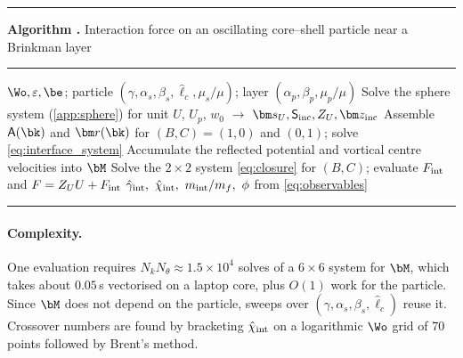 \begin{center}\begin{minipage}{\linewidth}\small
\hrule\smallskip
{}\label{alg:force}%
\noindent\textbf{Algorithm \thealgorithm.} Interaction force on an oscillating core--shell particle near a Brinkman layer
\smallskip\hrule\smallskip
\begin{algorithmic}[1]
\Require $\Wo,\varepsilon,\be$; particle $(\gamma,\alpha_s,\beta_s,\hat\ell_c,\mu_s/\mu)$; layer $(\alpha_p,\beta_p,\mu_p/\mu)$
\State Solve the sphere system (\cref{app:sphere}) for unit $U$, $U_p$, $w_0$ $\to$ $\bm s_U,\mathsf S_{\rm inc},Z_U,\bm z_{\rm inc}$
 
  \State Assemble $\mathsf A(\bk)$ and $\bm r(\bk)$ for $(B,C)=(1,0)$ and $(0,1)$; solve \cref{eq:interface_system}
  \State Accumulate the reflected potential and vortical centre velocities into $\bM$
\EndFor
\State Solve the $2\times2$ system \cref{eq:closure} for $(B,C)$; evaluate $F_{\rm int}$ and $F=Z_UU+F_{\rm int}$
\State \Return $\hat\gamma_{\rm int},\ \hat\chi_{\rm int},\ m_{\rm int}/m_f,\ \phi$ from \cref{eq:observables}
\end{algorithmic}
\smallskip\hrule
\end{minipage}\end{center}

\paragraph*{Complexity.} One evaluation requires $N_kN_\theta\approx1.5\times10^4$ solves of a $6\times6$ system for
$\bM$, which takes about $0.05$\,s vectorised on a laptop core, plus $O(1)$ work for the particle. Since $\bM$ does not
depend on the particle, sweeps over $(\gamma,\alpha_s,\beta_s,\hat\ell_c)$ reuse it. Crossover numbers are found by
bracketing $\hat\chi_{\rm int}$ on a logarithmic $\Wo$ grid of 70 points followed by Brent's method.

